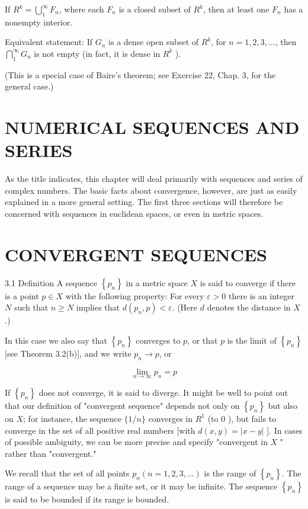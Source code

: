 \documentclass[10pt]{article}
\begin{document}
If $R^{k}=\bigcup_{1}^{\infty} F_{n}$, where each $F_{n}$ is a closed subset of $R^{k}$, then at least one $F_{n}$ has a nonempty interior.

Equivalent statement: If $G_{n}$ is a dense open subset of $R^{k}$, for $n=1,2,3, \ldots$, then $\bigcap_{1}^{\infty} G_{n}$ is not empty (in fact, it is dense in $R^{k}$ ).

(This is a special case of Baire's theorem; see Exercise 22, Chap. 3, for the general case.)

\section{NUMERICAL SEQUENCES AND SERIES}
As the title indicates, this chapter will deal primarily with sequences and series of complex numbers. The basic facts about convergence, however, are just as easily explained in a more general setting. The first three sections will therefore be concerned with sequences in euclidean spaces, or even in metric spaces.

\section{CONVERGENT SEQUENCES}
3.1 Definition A sequence $\left\{p_{n}\right\}$ in a metric space $X$ is said to converge if there is a point $p \in X$ with the following property: For every $\varepsilon>0$ there is an integer $N$ such that $n \geq N$ implies that $d\left(p_{n}, p\right)<\varepsilon$. (Here $d$ denotes the distance in $X$.)

In this case we also say that $\left\{p_{n}\right\}$ converges to $p$, or that $p$ is the limit of $\left\{p_{n}\right\}$ [see Theorem 3.2(b)], and we write $p_{n} \rightarrow p$, or

$$
\lim _{n \rightarrow \infty} p_{n}=p
$$

If $\left\{p_{n}\right\}$ does not converge, it is said to diverge. It might be well to point out that our definition of "convergent sequence" depends not only on $\left\{p_{n}\right\}$ but also on $X$; for instance, the sequence $\{1 / n\}$ converges in $R^{1}$ (to 0 ), but fails to converge in the set of all positive real numbers [with $d(x, y)=|x-y|$ ]. In cases of possible ambiguity, we can be more precise and specify "convergent in $X$ " rather than "convergent."

We recall that the set of all points $p_{n}(n=1,2,3, \ldots)$ is the range of $\left\{p_{n}\right\}$. The range of a sequence may be a finite set, or it may be infinite. The sequence $\left\{p_{n}\right\}$ is said to be bounded if its range is bounded.
\end{document}

